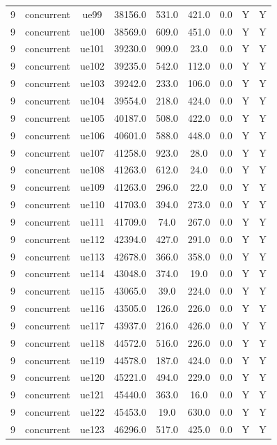 \begin{table}[ht]
\begin{tabular}{|c|c|c|c|c|c|c|c|c|}
9 & concurrent & ue99 & 38156.0 & 531.0 & 421.0 & 0.0 & Y & Y \\
9 & concurrent & ue100 & 38569.0 & 609.0 & 451.0 & 0.0 & Y & Y \\
9 & concurrent & ue101 & 39230.0 & 909.0 & 23.0 & 0.0 & Y & Y \\
9 & concurrent & ue102 & 39235.0 & 542.0 & 112.0 & 0.0 & Y & Y \\
9 & concurrent & ue103 & 39242.0 & 233.0 & 106.0 & 0.0 & Y & Y \\
9 & concurrent & ue104 & 39554.0 & 218.0 & 424.0 & 0.0 & Y & Y \\
9 & concurrent & ue105 & 40187.0 & 508.0 & 422.0 & 0.0 & Y & Y \\
9 & concurrent & ue106 & 40601.0 & 588.0 & 448.0 & 0.0 & Y & Y \\
9 & concurrent & ue107 & 41258.0 & 923.0 & 28.0 & 0.0 & Y & Y \\
9 & concurrent & ue108 & 41263.0 & 612.0 & 24.0 & 0.0 & Y & Y \\
9 & concurrent & ue109 & 41263.0 & 296.0 & 22.0 & 0.0 & Y & Y \\
9 & concurrent & ue110 & 41703.0 & 394.0 & 273.0 & 0.0 & Y & Y \\
9 & concurrent & ue111 & 41709.0 & 74.0 & 267.0 & 0.0 & Y & Y \\
9 & concurrent & ue112 & 42394.0 & 427.0 & 291.0 & 0.0 & Y & Y \\
9 & concurrent & ue113 & 42678.0 & 366.0 & 358.0 & 0.0 & Y & Y \\
9 & concurrent & ue114 & 43048.0 & 374.0 & 19.0 & 0.0 & Y & Y \\
9 & concurrent & ue115 & 43065.0 & 39.0 & 224.0 & 0.0 & Y & Y \\
9 & concurrent & ue116 & 43505.0 & 126.0 & 226.0 & 0.0 & Y & Y \\
9 & concurrent & ue117 & 43937.0 & 216.0 & 426.0 & 0.0 & Y & Y \\
9 & concurrent & ue118 & 44572.0 & 516.0 & 226.0 & 0.0 & Y & Y \\
9 & concurrent & ue119 & 44578.0 & 187.0 & 424.0 & 0.0 & Y & Y \\
9 & concurrent & ue120 & 45221.0 & 494.0 & 229.0 & 0.0 & Y & Y \\
9 & concurrent & ue121 & 45440.0 & 363.0 & 16.0 & 0.0 & Y & Y \\
9 & concurrent & ue122 & 45453.0 & 19.0 & 630.0 & 0.0 & Y & Y \\
9 & concurrent & ue123 & 46296.0 & 517.0 & 425.0 & 0.0 & Y & Y \\

\end{tabular}
\end{table}
